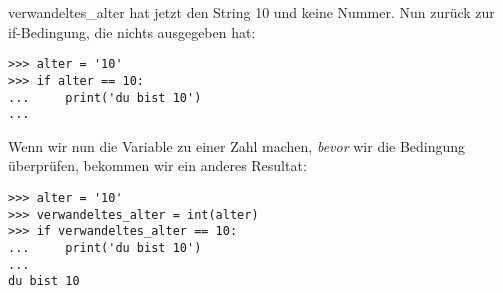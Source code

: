 \noindent
verwandeltes\_alter hat jetzt den String 10 und keine Nummer. Nun zurück zur if-Bedingung, die nichts ausgegeben hat:

\begin{Verbatim}[frame=single]
>>> alter = '10'
>>> if alter == 10:
...     print('du bist 10')
...
\end{Verbatim}

\noindent
Wenn wir nun die Variable zu einer Zahl machen, \emph{bevor} wir die Bedingung überprüfen, bekommen wir ein anderes Resultat:

\begin{Verbatim}[frame=single]
>>> alter = '10'
>>> verwandeltes_alter = int(alter)
>>> if verwandeltes_alter == 10:
...     print('du bist 10')
...
du bist 10
\end{Verbatim}

\newpage
